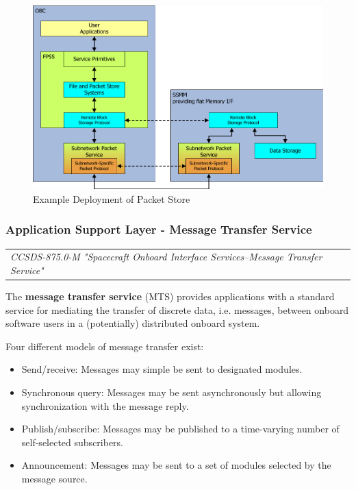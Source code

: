 \begin{figure}[h]
\centering\includegraphics[scale=0.3]{fig/example_deployment_of_packet_store}
\caption{Example Deployment of Packet Store}
\label{fig:Example Deployment of Packet Store}
\end{figure}

\subsubsection{Application Support Layer - Message Transfer Service}

\begin{tabular}{l}
\textit{CCSDS-875.0-M "Spacecraft Onboard Interface Services--Message Transfer Service" \cite{}} 
\end{tabular}

The \textbf{message transfer service} (MTS) provides applications with a standard service for mediating the transfer of discrete data, i.e. messages, between onboard software users in a (potentially) distributed onboard system.

Four different models of message transfer exist:
\begin{itemize}
\item Send/receive: Messages may simple be sent to designated modules.
\item Synchronous query: Messages may be sent asynchronously but allowing synchronization with the message reply.
\item Publish/subscribe: Messages may be published to a time-varying number of self-selected subscribers.
\item Announcement: Messages may be sent to a set of modules selected by the message source.
\end{itemize}

